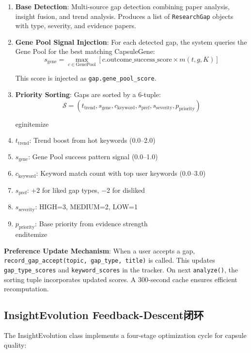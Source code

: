 \documentclass[anon,9pt]{article}
\begin{document}
\begin{enumerate}
    \item \textbf{Base Detection}: Multi-source gap detection combining paper analysis, insight fusion, and trend analysis. Produces a list of \texttt{ResearchGap} objects with type, severity, and evidence papers.

    \item \textbf{Gene Pool Signal Injection}: For each detected gap, the system queries the Gene Pool for the best matching CapsuleGene:
    $$s_{\text{gene}} = \max_{c \in \text{GenePool}} \left[ c.\text{outcome\_success\_score} \times m(t, g, K) \right]$$

    This score is injected as \texttt{gap.gene\_pool\_score}.

    \item \textbf{Priority Sorting}: Gaps are sorted by a 6-tuple:
    $$\mathcal{S} = (t_{\text{trend}}, s_{\text{gene}}, c_{\text{keyword}}, s_{\text{pref}}, s_{\text{severity}}, p_{\text{priority}})$$

    \egin{itemize}
        \item $t_{\text{trend}}$: Trend boost from hot keywords (0.0--2.0)
        \item $s_{\text{gene}}$: Gene Pool success pattern signal (0.0--1.0)
        \item $c_{\text{keyword}}$: Keyword match count with top user keywords (0.0--3.0)
        \item $s_{\text{pref}}$: $+2$ for liked gap types, $-2$ for disliked
        \item $s_{\text{severity}}$: HIGH=3, MEDIUM=2, LOW=1
        \item $p_{\text{priority}}$: Base priority from evidence strength
    \\end{itemize}
\end{enumerate}

\textbf{Preference Update Mechanism}: When a user accepts a gap, \texttt{record\_gap\_accept(topic, gap\_type, title)} is called. This updates \texttt{gap\_type\_scores} and \texttt{keyword\_scores} in the tracker. On next \texttt{analyze()}, the sorting tuple incorporates updated scores. A 300-second cache ensures efficient recomputation.

\subsection{InsightEvolution Feedback-Descent闭环}

The InsightEvolution class implements a four-stage optimization cycle for capsule quality:
\end{document}
